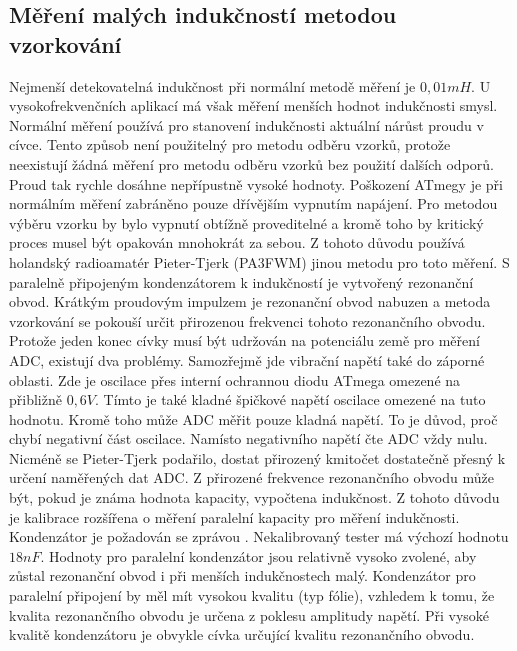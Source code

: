 \subsection{Měření malých indukčností metodou vzorkování}

Nejmenší detekovatelná indukčnost při normální metodě měření je \(0,01mH\).
U vysokofrekvenčních aplikací má však měření menších hodnot indukčnosti smysl.
Normální měření používá pro stanovení indukčnosti aktuální nárůst proudu v cívce.
Tento způsob není použitelný pro metodu odběru vzorků, protože neexistují žádná měření pro metodu odběru vzorků
bez použití dalších odporů.
Proud tak rychle dosáhne nepřípustně vysoké hodnoty.
Poškození ATmegy je při normálním měření zabráněno pouze dřívějším vypnutím napájení.
Pro metodou výběru vzorku by bylo vypnutí obtížně proveditelné a kromě toho by kritický proces
musel být opakován mnohokrát za sebou.
Z tohoto důvodu používá holandský radioamatér Pieter-Tjerk (PA3FWM) jinou metodu pro toto měření.
S paralelně připojeným kondenzátorem k indukčností je vytvořený rezonanční obvod.
Krátkým proudovým impulzem je rezonanční obvod nabuzen a metoda vzorkování se pokouší určit
přirozenou frekvenci tohoto rezonančního obvodu.
Protože jeden konec cívky musí být udržován na potenciálu země pro měření ADC,
existují dva problémy. Samozřejmě jde vibrační napětí také do záporné oblasti.
Zde je oscilace přes interní ochrannou diodu ATmega omezené na přibližně \(0,6V\).
Tímto je také kladné špičkové napětí oscilace omezené na tuto hodnotu.
Kromě toho může ADC měřit pouze kladná napětí.
To je důvod, proč chybí negativní část oscilace. Namísto negativního napětí čte ADC vždy nulu.
Nicméně se Pieter-Tjerk podařilo, dostat přirozený kmitočet dostatečně přesný k určení naměřených dat ADC.
Z přirozené frekvence rezonančního obvodu může být, pokud je známa hodnota kapacity, vypočtena indukčnost.
Z tohoto důvodu je kalibrace rozšířena o měření paralelní kapacity pro měření indukčnosti.
Kondenzátor je požadován se zprávou .
Nekalibrovaný tester má výchozí hodnotu \(18nF\).
Hodnoty pro paralelní kondenzátor jsou relativně vysoko zvolené,
aby zůstal rezonanční obvod i při menších indukčnostech malý.
Kondenzátor pro paralelní připojení by měl mít vysokou kvalitu (typ fólie), vzhledem k tomu,
že kvalita rezonančního obvodu je určena z poklesu amplitudy napětí.
Při vysoké kvalitě kondenzátoru je obvykle cívka určující kvalitu rezonančního obvodu.
